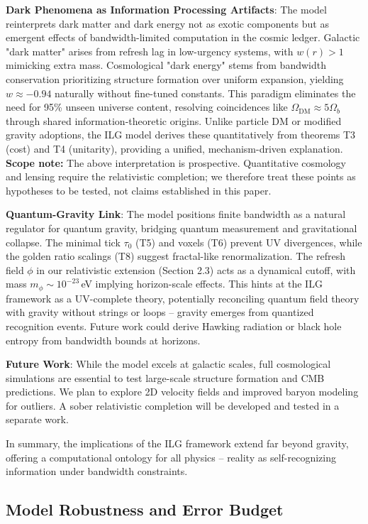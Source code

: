 \documentclass[12pt,a4paper]{article}
\begin{document}
\textbf{Dark Phenomena as Information Processing Artifacts}: The model reinterprets dark matter and dark energy not as exotic components but as emergent effects of bandwidth-limited computation in the cosmic ledger. Galactic "dark matter" arises from refresh lag in low-urgency systems, with $w(r) > 1$ mimicking extra mass. Cosmological "dark energy" stems from bandwidth conservation prioritizing structure formation over uniform expansion, yielding $w \approx -0.94$ naturally without fine-tuned constants. This paradigm eliminates the need for 95\% unseen universe content, resolving coincidences like $\Omega_\mathrm{DM} \approx 5 \Omega_b$ through shared information-theoretic origins. Unlike particle DM or modified gravity adoptions, the ILG model derives these quantitatively from theorems T3 (cost) and T4 (unitarity), providing a unified, mechanism-driven explanation.
\textbf{Scope note:} The above interpretation is prospective. Quantitative cosmology and lensing require the relativistic completion; we therefore treat these points as hypotheses to be tested, not claims established in this paper.

\textbf{Quantum-Gravity Link}: The model positions finite bandwidth as a natural regulator for quantum gravity, bridging quantum measurement and gravitational collapse. The minimal tick $\tau_0$ (T5) and voxels (T6) prevent UV divergences, while the golden ratio scalings (T8) suggest fractal-like renormalization. The refresh field $\phi$ in our relativistic extension (Section 2.3) acts as a dynamical cutoff, with mass $m_\phi \sim 10^{-23}$\,eV implying horizon-scale effects. This hints at the ILG framework as a UV-complete theory, potentially reconciling quantum field theory with gravity without strings or loops -- gravity emerges from quantized recognition events. Future work could derive Hawking radiation or black hole entropy from bandwidth bounds at horizons.

\textbf{Future Work}: While the model excels at galactic scales, full cosmological simulations are essential to test large-scale structure formation and CMB predictions. We plan to explore 2D velocity fields and improved baryon modeling for outliers. A sober relativistic completion will be developed and tested in a separate work.

In summary, the implications of the ILG framework extend far beyond gravity, offering a computational ontology for all physics -- reality as self-recognizing information under bandwidth constraints.

\subsection{Model Robustness and Error Budget}
\end{document}
